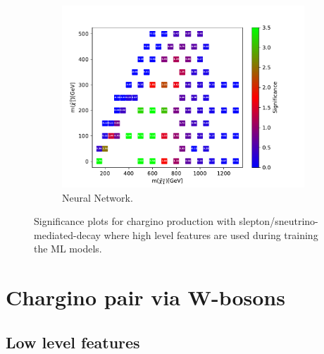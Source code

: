 \begin{figure}[H]
    \begin{subfigure}[t!]{0.49\textwidth}
    \includegraphics[width = \textwidth]{Figures/Significances/significance_NN_slepsnu_High_level.pdf}
    \caption{Neural Network.}
        \label{fig:signHighslepsnuNN}
    \end{subfigure}
    \caption{Significance plots for chargino production with slepton/sneutrino-mediated-decay where high level features are used during training the ML models.}
    \label{fig:signHighslepsnu}
\end{figure}







\section{Chargino pair via W-bosons}

\subsection{Low level features}

